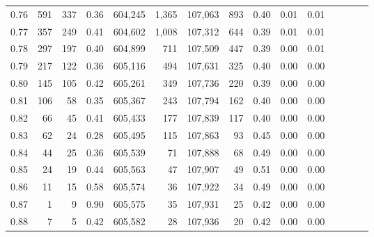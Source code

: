 \begin{tabular}{rrrcrrrrrrrrrrr}
0.76 &     591 &    337 &                                       0.36 &  604,245 &    1,365 &  107,063 &      893 &  0.40 &  0.01 &                         0.01 \\
0.77 &     357 &    249 &                                       0.41 &  604,602 &    1,008 &  107,312 &      644 &  0.39 &  0.01 &                         0.01 \\
0.78 &     297 &    197 &                                       0.40 &  604,899 &      711 &  107,509 &      447 &  0.39 &  0.00 &                         0.01 \\
0.79 &     217 &    122 &                                       0.36 &  605,116 &      494 &  107,631 &      325 &  0.40 &  0.00 &                         0.00 \\
0.80 &     145 &    105 &                                       0.42 &  605,261 &      349 &  107,736 &      220 &  0.39 &  0.00 &                         0.00 \\
0.81 &     106 &     58 &                                       0.35 &  605,367 &      243 &  107,794 &      162 &  0.40 &  0.00 &                         0.00 \\
0.82 &      66 &     45 &                                       0.41 &  605,433 &      177 &  107,839 &      117 &  0.40 &  0.00 &                         0.00 \\
0.83 &      62 &     24 &                                       0.28 &  605,495 &      115 &  107,863 &       93 &  0.45 &  0.00 &                         0.00 \\
0.84 &      44 &     25 &                                       0.36 &  605,539 &       71 &  107,888 &       68 &  0.49 &  0.00 &                         0.00 \\
0.85 &      24 &     19 &                                       0.44 &  605,563 &       47 &  107,907 &       49 &  0.51 &  0.00 &                         0.00 \\
0.86 &      11 &     15 &                                       0.58 &  605,574 &       36 &  107,922 &       34 &  0.49 &  0.00 &                         0.00 \\
0.87 &       1 &      9 &                                       0.90 &  605,575 &       35 &  107,931 &       25 &  0.42 &  0.00 &                         0.00 \\
0.88 &       7 &      5 &                                       0.42 &  605,582 &       28 &  107,936 &       20 &  0.42 &  0.00 &                         0.00 \\

\end{tabular}
